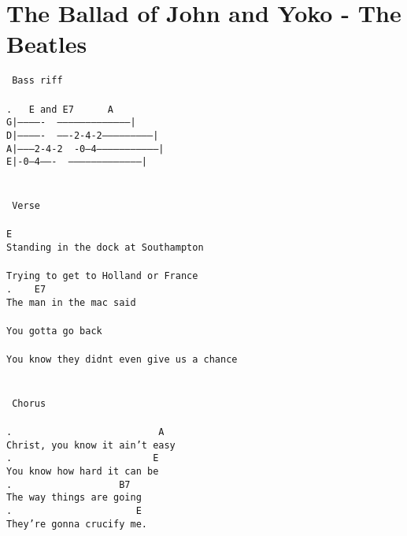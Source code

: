 \newpage
\section{The Ballad of John and Yoko - The Beatles}
\label{The Ballad of John and Yoko - The Beatles}
\texttt{\lbrack\ Bass\ riff\rbrack\\
\\
.\ \ \ E\ and\ E7\ \ \ \ \ \ A\\
G|-------------\ \ --------------------------------------|\\
D|-------------\ \ -------2-4-2--------------------------|\\
A|--------2-4-2\ \ -0---4--------------------------------|\\
E|-0---4-------\ \ --------------------------------------|\\
\\
\\
\lbrack\ Verse\rbrack\\
\\
E\\
Standing\ in\ the\ dock\ at\ Southampton\\
\\
Trying\ to\ get\ to\ Holland\ or\ France\\
.\ \ \ \ E7\\
The\ man\ in\ the\ mac\ said\\
\\
\;You\ gotta\ go\ back\;\\
\\
You\ know\ they\ didnt\ even\ give\ us\ a\ chance\\
\\
\\
\lbrack\ Chorus\rbrack\\
\\
.\ \ \ \ \ \ \ \ \ \ \ \ \ \ \ \ \ \ \ \ \ \ \ \ \ \ A\\
Christ,\ you\ know\ it\ ain't\ easy\\
.\ \ \ \ \ \ \ \ \ \ \ \ \ \ \ \ \ \ \ \ \ \ \ \ \ E\\
You\ know\ how\ hard\ it\ can\ be\\
.\ \ \ \ \ \ \ \ \ \ \ \ \ \ \ \ \ \ \ B7\\
The\ way\ things\ are\ going\ \\
.\ \ \ \ \ \ \ \ \ \ \ \ \ \ \ \ \ \ \ \ \ \ E\\
They're\ gonna\ crucify\ me.\\
\\
\\
}
